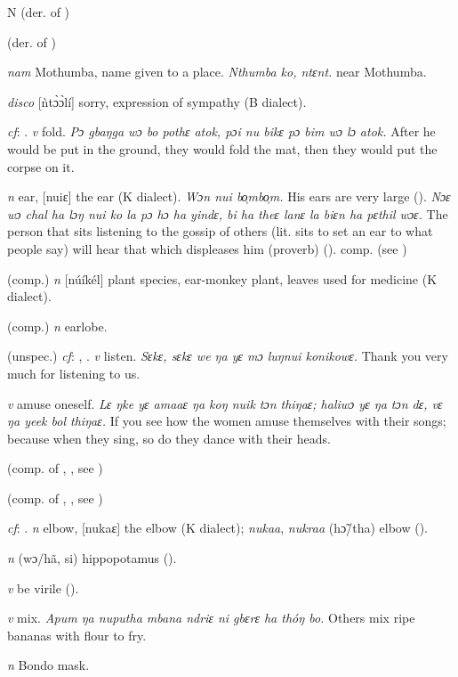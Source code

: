 \begin{letter}{N}
 (der. of ) 

 (der. of ) 

 \textit{nam} Mothumba, name given to a place. \textit{Nthumba ko, ntɛnt.} near Mothumba.

 \textit{disco} [ǹtɔ̀ɔ̀lí] sorry, expression of sympathy (B dialect).

 \textit{cf}: . \textit{v} fold. \textit{Pɔ gbaŋga wɔ bo pothɛ atok, pɔi nu bikɛ pɔ bim wɔ lɔ atok.} After he would be put in the ground, they would fold the mat, then they would put the corpse on it.

 \textit{n} ear, [nuiɛ] the ear (K dialect). \textit{Wɔn nui bo̹mbo̹m.} His ears are very large (\citealt{Pichl1967}). \textit{Nɔɛ wɔ chal ha lɔŋ nui ko la pɔ hɔ ha yindɛ, bi ha theɛ lanɛ la biɛn ha pɛthil wɔɛ.} The person that sits listening to the gossip of others (lit. sits to set an ear to what people say) will hear that which displeases him (proverb) (\citealt{TISLL1979}). comp.  (see ) 

 (comp.) \textit{n} [núíkél] plant species, ear-monkey plant, leaves used for medicine (K dialect). 

 (comp.) \textit{n} earlobe.

 (unspec.) \textit{cf}: , . \textit{v} listen. \textit{Sɛkɛ, sɛkɛ we ŋa yɛ mɔ luŋnui konikowɛ.} Thank you very much for listening to us.

 \textit{v} amuse oneself. \textit{Lɛ ŋke yɛ amaaɛ ŋa koŋ nuik tɔn thiŋaɛ; haliwɔ yɛ ŋa tɔn dɛ, vɛ ŋa yeek bol thiŋaɛ.} If you see how the women amuse themselves with their songs; because when they sing, so do they dance with their heads.

 (comp. of , , see ) 

 (comp. of , , see ) 

 \textit{cf}: . \textit{n} elbow, [nukaɛ] the elbow (K dialect); \textit{nukaa}, \textit{nukraa} (hɔ̃/tha) elbow (\citealt{Pichl1967}).

 \textit{n} (wɔ/hã, si) hippopotamus (\citealt{Pichl1967}).

 \textit{v} be virile (\citealt{Pichl1967}). 

 \textit{v} mix. \textit{Apum ŋa nuputha mbana ndriɛ ni gbɛrɛ ha thóŋ bo.} Others mix ripe bananas with flour to fry.

 \textit{n} Bondo mask.

\end{letter}
